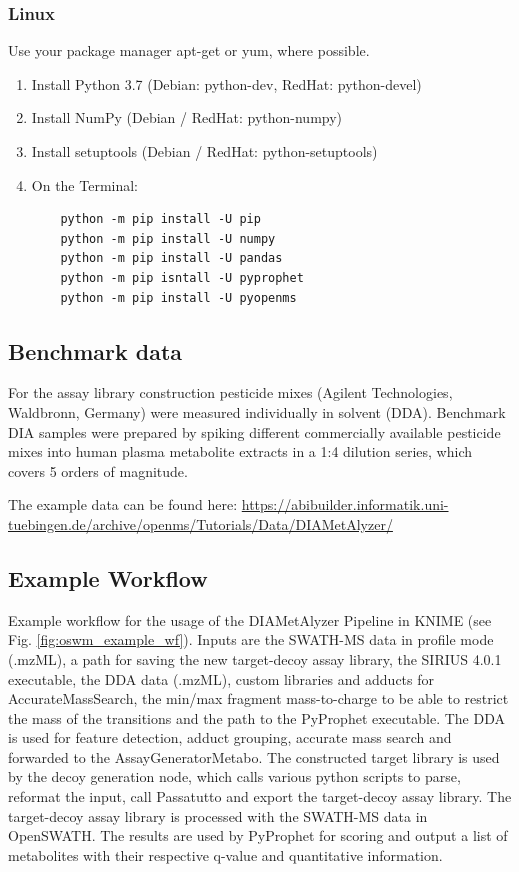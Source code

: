 \subsubsection{Linux}
Use your package manager apt-get or yum, where possible.
\begin{enumerate}
  \item Install Python 3.7 (Debian: python-dev, RedHat: python-devel)
  \item Install NumPy (Debian / RedHat: python-numpy)
  \item Install setuptools (Debian / RedHat: python-setuptools)
  \item On the Terminal:
    \begin{listing}
\begin{verbatim}
    python -m pip install -U pip
    python -m pip install -U numpy
    python -m pip install -U pandas
    python -m pip isntall -U pyprophet
    python -m pip install -U pyopenms
    \end{verbatim}
\end{listing}
\end{enumerate}

\subsection{Benchmark data}
For the assay library construction pesticide mixes (Agilent Technologies, Waldbronn, Germany) were measured individually in solvent (DDA). 
Benchmark DIA samples were prepared by spiking different commercially available pesticide mixes into human plasma metabolite extracts in a 1:4 dilution series, which covers 5 orders of magnitude.

\noindent The example data can be found here:
\url{https://abibuilder.informatik.uni-tuebingen.de/archive/openms/Tutorials/Data/DIAMetAlyzer/}

\subsection{Example Workflow}
Example workflow for the usage of the DIAMetAlyzer Pipeline in KNIME (see Fig. \ref{fig:oswm_example_wf}). Inputs are the SWATH-MS data in profile mode (.mzML), a path for saving the new target-decoy assay library, the SIRIUS 4.0.1 executable, the DDA data (.mzML), custom libraries and adducts for AccurateMassSearch, the min/max fragment mass-to-charge to be able to restrict the mass of the transitions and the path to the PyProphet executable. The DDA is used for feature detection, adduct grouping, accurate mass search and forwarded to the AssayGeneratorMetabo. The constructed target library is used by the decoy generation node, which calls various python scripts to parse, reformat the input, call Passatutto and export the target-decoy assay library. The target-decoy assay library is processed with the SWATH-MS data in OpenSWATH. The results are used by PyProphet for scoring and output a list of metabolites with their respective q-value and quantitative information.


